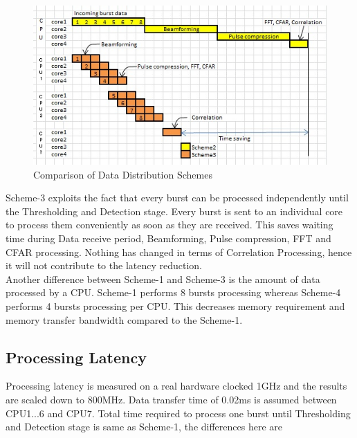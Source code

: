 \begin{figure}[h!]
	\centering
	\includegraphics[]{figures/scheme4_comparison}
	\caption{Comparison of Data Distribution Schemes}
	\label{fig:mm:scheme4_comparison}
\end{figure}

Scheme-3 exploits the fact that every burst can be processed independently until the Thresholding and Detection stage. Every burst is sent to an individual core to process them conveniently as soon as they are received. This saves waiting time during Data receive period, Beamforming, Pulse compression, FFT and CFAR processing. Nothing has changed in terms of Correlation Processing, hence it will not contribute to the latency reduction.\\[0.2cm]
Another difference between Scheme-1 and Scheme-3 is the amount of data processed by a CPU. Scheme-1 performs 8 bursts processing whereas Scheme-4 performs 4 bursts processing per CPU. This decreases memory requirement and memory transfer bandwidth compared to the Scheme-1.

\subsection{Processing Latency}
\label{ss:mm:scheme4:latency}
Processing latency is measured on a real hardware clocked 1GHz and the results are scaled down to 800MHz. Data transfer time of 0.02ms is assumed between CPU1...6 and CPU7. Total time required to process one burst until Thresholding and Detection stage is same as Scheme-1, the differences here are 

